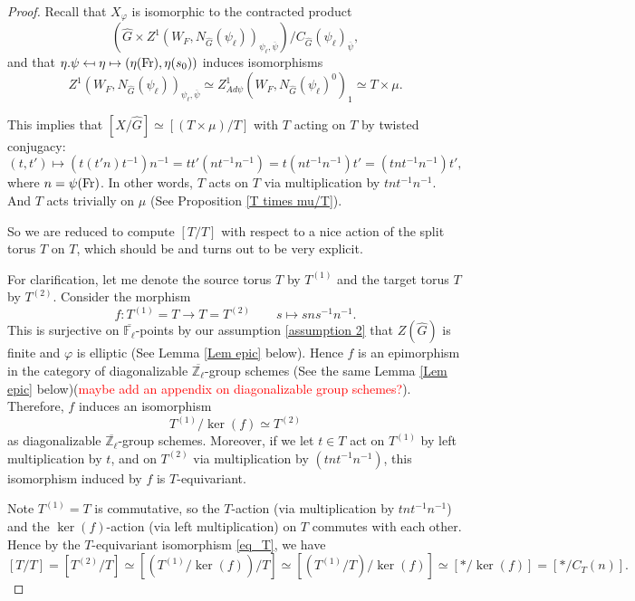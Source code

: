 \begin{proof}
	Recall that $X_{\varphi}$ is isomorphic to the contracted product 
	$$(\hat{G} \times Z^1(W_F, N_{\hat{G}}(\psi_{\ell}))_{\psi_{\ell}, \overline{\psi}})/C_{\hat{G}}(\psi_{\ell})_{\overline{\psi}},$$ 
	and that $\eta.\psi \mapsfrom \eta \mapsto (\eta(\operatorname{Fr}), \eta(s_0))$ induces isomorphisms
	$$Z^1(W_F, N_{\hat{G}}(\psi_{\ell}))_{\psi_{\ell}, \overline{\psi}} \simeq Z^1_{Ad\psi}(W_F, N_{\hat{G}}(\psi_{\ell})^0)_1 \simeq T \times \mu.$$
	
	This implies that $[X/\hat{G}] \simeq [(T \times \mu)/T]$ with $T$ acting on $T$ by twisted conjugacy:
	$$(t, t') \mapsto \left(t(t'n)t^{-1}\right)n^{-1}=tt'(nt^{-1}n^{-1})=t(nt^{-1}n^{-1})t'=(tnt^{-1}n^{-1})t',$$
	where $n=\psi(\operatorname{Fr})$. In other words, $T$ acts on $T$ via multiplication by $tnt^{-1}n^{-1}$. And $T$ acts trivially on $\mu$ (See Proposition \ref{T times mu/T}).
	
	So we are reduced to compute $[T/T]$ with respect to a nice action of the split torus $T$ on $T$, which should be and turns out to be very explicit.
	
	For clarification, let me denote the source torus $T$ by $T^{(1)}$ and the target torus $T$ by $T^{(2)}$. Consider the morphism
	$$f: T^{(1)} = T \longrightarrow T = T^{(2)} \qquad s \longmapsto sns^{-1}n^{-1}.$$
	This is surjective on $\overline{\mathbb{F}_{\ell}}$-points by our assumption \ref{assumption 2} that $Z(\hat{G})$ is finite and $\varphi$ is elliptic (See Lemma \ref{Lem epic} below). Hence $f$ is an epimorphism in the category of diagonalizable $\overline{\mathbb{Z}_{\ell}}$-group schemes (See the same Lemma \ref{Lem epic} below)(\textcolor{red}{maybe add an appendix on diagonalizable group schemes?}). Therefore, $f$ induces an isomorphism 
	\begin{equation}\label{eq_T}
		T^{(1)}/\ker(f) \simeq T^{(2)}
	\end{equation}
	as diagonalizable $\overline{\mathbb{Z}_{\ell}}$-group schemes. Moreover, if we let $t \in T$ act on $T^{(1)}$ by left multiplication by $t$, and on $T^{(2)}$ via multiplication by $(tnt^{-1}n^{-1})$, this isomorphism induced by $f$ is $T$-equivariant.
	
	Note $T^{(1)}=T$ is commutative, so the $T$-action (via multiplication by $tnt^{-1}n^{-1}$) and the $\ker(f)$-action (via left multiplication) on $T$ commutes with each other. Hence by the $T$-equivariant isomorphism \eqref{eq_T}, we have
	$$[T/T] = [T^{(2)}/T] \simeq \left[\left(T^{(1)}/\ker(f)\right)/T\right] \simeq \left[\left(T^{(1)}/T\right)/\ker(f)\right] \simeq [*/\ker(f)] = [*/C_T(n)].$$ 
	

\end{proof}
